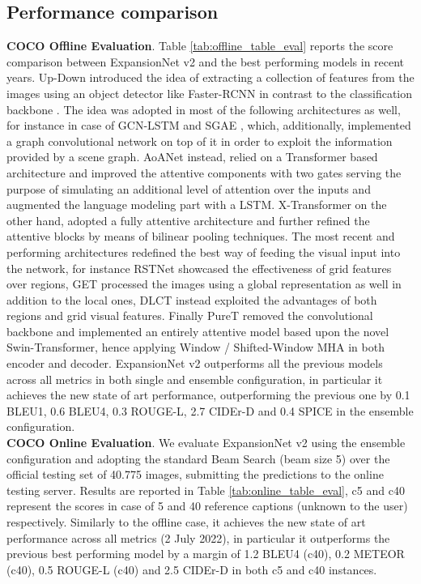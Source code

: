 \subsection{Performance comparison}

\textbf{COCO Offline Evaluation}. Table \ref{tab:offline_table_eval} reports the score comparison between ExpansionNet v2 and the best performing models in recent years. Up-Down \cite{anderson2018bottom} introduced the idea of extracting a collection of features from the images using an object detector like Faster-RCNN \cite{ren2015faster} in contrast to the classification backbone \cite{xu2015show}. The idea was adopted in most of the following architectures as well, for instance in case of GCN-LSTM \cite{yao2018exploring} and SGAE \cite{yang2019auto}, which, additionally, implemented a graph convolutional network on top of it in order to exploit the information provided by a scene graph. AoANet \cite{huang2019attention} instead, relied on a Transformer based architecture and improved the attentive components with two gates serving the purpose of simulating an additional level of attention over the inputs and augmented the language modeling part with a LSTM. X-Transformer \cite{pan2020x} on the other hand, adopted a fully attentive architecture and further refined the attentive blocks by means of bilinear pooling techniques. The most recent and performing architectures redefined the best way of feeding the visual input into the network, for instance RSTNet \cite{zhang2021rstnet} showcased the effectiveness of grid features over regions, GET \cite{ji2021improving} processed the images using a global representation as well in addition to the local ones, DLCT \cite{luo2021dual} instead exploited the advantages of both regions and grid visual features. Finally
PureT \cite{wang2022end} removed the convolutional backbone and implemented an entirely attentive model based upon the novel Swin-Transformer, hence applying Window / Shifted-Window MHA in both encoder and decoder.
ExpansionNet v2 outperforms all the previous models across all metrics in both single and ensemble configuration, in particular it achieves the new state of art performance, outperforming the previous one by 0.1 BLEU1, 0.6 BLEU4, 0.3 ROUGE-L, 2.7 CIDEr-D and 0.4 SPICE in the ensemble configuration. \\

\noindent
\textbf{COCO Online Evaluation}. We evaluate ExpansionNet v2 using the ensemble configuration and adopting the standard Beam Search (beam size 5) over the official testing set of 40.775 images, submitting the predictions to the online testing server. Results are reported in Table \ref{tab:online_table_eval}, c5 and c40 represent the scores in case of 5 and 40 reference captions (unknown to the user) respectively. Similarly to the offline case, it achieves the new state of art performance across all metrics (2 July 2022), in particular it outperforms the previous best performing model by a margin of 1.2 BLEU4 (c40), 0.2 METEOR (c40), 0.5 ROUGE-L (c40) and 2.5 CIDEr-D in both c5 and c40 instances. \\



